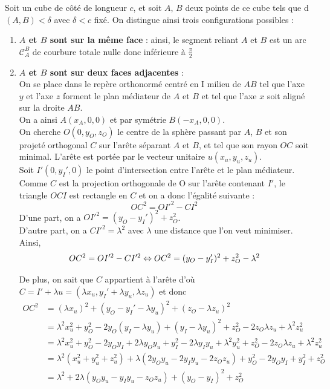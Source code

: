 \documentclass{article}
\begin{document}
Soit un cube de côté de longueur $c$, et soit $A$, $B$ deux points de ce cube tels que d$(A, B) < \delta$ avec $\delta < c$ fixé.
On distingue ainsi trois configurations possibles :
\begin{enumerate}
    \item \textbf{$A$ et $B$ sont sur la même face} : ainsi, le segment reliant $A$ et $B$ est un arc $\mathcal{C}_A^B$ de courbure totale nulle donc inférieure à $\frac{\pi}{2}$
    
    \item \textbf{$A$ et $B$ sont sur deux faces adjacentes} : \\
    On se place dans le repère orthonormé centré en I milieu de $AB$ tel que l'axe $y$ et l'axe $z$ forment le plan médiateur de $A$ et $B$ et tel que l'axe $x$ soit aligné sur la droite $AB$.\\
    On a ainsi $A(x_A, 0, 0)$ et par symétrie $B(-x_A, 0, 0)$.\\
    On cherche $O(0, y_O, z_O)$ le centre de la sphère passant par $A$, $B$ et son projeté orthogonal $C$ sur l'arête séparant $A$ et $B$, et tel que son rayon $OC$ soit minimal. L'arête est portée par le vecteur unitaire $u(x_u, y_u, z_u)$.\\
    Soit $I'(0, y_I', 0)$ le point d'intersection entre l'arête et le plan médiateur. Comme $C$ est la projection orthogonale de O sur l'arête contenant $I'$, le triangle $OCI$ est rectangle en $C$ et on a donc l'égalité suivante :
    $$OC^2 = OI'^2 - CI^2$$
    D'une part, on a $OI'^2 = (y_O - y_I')^2 + z_O^2$.\\
    D'autre part, on a $CI'^2 = \lambda^2$ avec $\lambda$ une distance que l'on veut minimiser.\\
    Ainsi, 
    \begin{equation}\label{eq:pythagoras}
        OC^2 = OI'^2 - CI'^2 \Leftrightarrow OC^2 = (y_O - y_I')^2 + z_O^2 - \lambda^2\\
    \end{equation}
    
    De plus, on sait que $C$ appartient à l'arête d'où $C = I' + \lambda u = (\lambda x_u, y_I' + \lambda y_u, \lambda z_u)$ et donc 
    \begin{align}
        OC^2 &= (\lambda x_u)^2 + (y_O - y_I' - \lambda y_u)^2 + (z_O - \lambda z_u)^2 \nonumber\\
             &= \lambda^2x_u^2 + y_O^2 - 2y_O(y_I - \lambda y_u) + (y_I - \lambda y_u)^2 + z_O^2 - 2z_O\lambda z_u + \lambda^2z_u^2 \nonumber\\
             &= \lambda^2x_u^2 + y_O^2 - 2y_Oy_I + 2\lambda y_Oy_u + y_I^2 - 2\lambda y_Iy_u + \lambda^2y_u^2 + z_O^2 - 2z_O\lambda z_u + \lambda^2z_u^2 \nonumber\\
             &= \lambda^2(x_u^2 + y_u^2 + z_u^2) + \lambda(2y_Oy_u - 2y_Iy_u - 2z_Oz_u) + y_O^2 - 2y_Oy_I + y_I^2 + z_O^2 \nonumber\\
             &= \lambda^2 + 2\lambda(y_Oy_u - y_Iy_u - z_Oz_u) + (y_O - y_I)^2 + z_O^2 \label{eq:vector}
    \end{align}


\end{enumerate}
\end{document}

